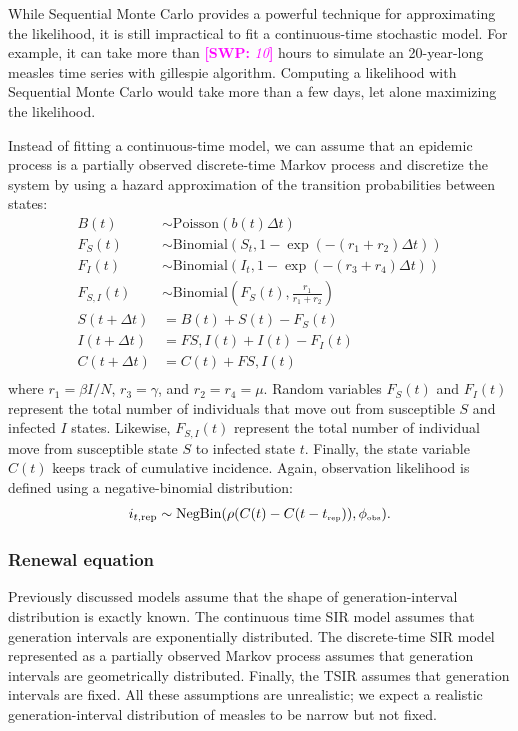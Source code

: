 \documentclass{article}
\newcommand{\comment}[3]{\textcolor{#1}{\textbf{[#2: }\textsl{#3}\textbf{]}}}
\newcommand{\swp}[1]{\comment{magenta}{SWP}{#1}}
\newcommand{\tsub}[2]{#1_{{\textrm{\tiny #2}}}}
\begin{document}
While Sequential Monte Carlo provides a powerful technique for approximating the likelihood, it is still impractical to fit a continuous-time stochastic model. 
For example, it can take more than \swp{10} hours to simulate an 20-year-long measles time series with gillespie algorithm. 
Computing a likelihood with Sequential Monte Carlo would take more than a few days, let alone maximizing the likelihood.

Instead of fitting a continuous-time model, we can assume that an epidemic process is a partially observed discrete-time Markov process and discretize the system by using a hazard approximation of the transition probabilities between states:
\begin{equation}
\begin{aligned}
B(t) &\sim \mathrm{Poisson}(b(t) \Delta t)\\
F_{S}(t) &\sim \mathrm{Binomial}(S_t, 1 - \exp(- (r_1 + r_2) \Delta t))\\
F_{I}(t) &\sim \mathrm{Binomial}(I_t, 1 - \exp(- (r_3 + r_4) \Delta t))\\
F_{S,I}(t) &\sim \mathrm{Binomial}\left(F_{S}(t), \frac{r_1}{r_1 + r_2}\right)\\
S(t+\Delta t) &= B(t) + S(t) - F_{S}(t) \\
I(t+\Delta t) &= F{S,I}(t) + I(t) - F_{I}(t)\\
C(t+\Delta t) &= C(t) + F{S,I}(t)\\
\end{aligned}
\end{equation}
where $r_1 = \beta I/N$, $r_3 = \gamma$, and $r_2 = r_4 = \mu$.
Random variables $F_S(t)$ and $F_I(t)$ represent the total number of individuals that move out from susceptible $S$ and infected $I$ states. Likewise, $F_{S, I}(t)$ represent the total number of individual move from susceptible state $S$ to infected state $t$.
Finally, the state variable $C(t)$ keeps track of cumulative incidence.
Again, observation likelihood is defined using a negative-binomial distribution:
\begin{equation}
i_{t, {\tiny \textrm{rep}}} \sim \mathrm{NegBin}(\rho (C(t) - C(t - \tsub{t}{rep})) , \tsub{\phi}{obs}).
\end{equation}

\subsubsection*{Renewal equation}

Previously discussed models assume that the shape of generation-interval distribution is exactly known.
The continuous time SIR model assumes that generation intervals are exponentially distributed.
The discrete-time SIR model represented as a partially observed Markov process assumes that generation intervals are geometrically distributed.
Finally, the TSIR assumes that generation intervals are fixed.
All these assumptions are unrealistic; we expect a realistic generation-interval distribution of measles to be narrow but not fixed.
\end{document}

